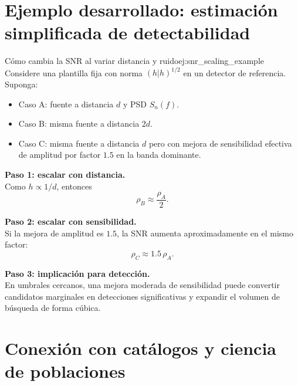 \section{Ejemplo desarrollado: estimación simplificada de detectabilidad}
\label{sec:ejemplo_detectabilidad}

\begin{ejemplo}{Cómo cambia la SNR al variar distancia y ruido}{ej:snr_scaling_example}
Considere una plantilla fija con norma $(h|h)^{1/2}$ en un detector de referencia. Suponga:
\begin{itemize}[leftmargin=2em]
  \item Caso A: fuente a distancia $d$ y PSD $S_n(f)$.
  \item Caso B: misma fuente a distancia $2d$.
  \item Caso C: misma fuente a distancia $d$ pero con mejora de sensibilidad efectiva de amplitud por factor $1.5$ en la banda dominante.
\end{itemize}

\textbf{Paso 1: escalar con distancia.} \\
Como $h\propto1/d$, entonces
\begin{equation}
\rho_B \approx \frac{\rho_A}{2}.
\end{equation}

\textbf{Paso 2: escalar con sensibilidad.} \\
Si la mejora de amplitud es $1.5$, la SNR aumenta aproximadamente en el mismo factor:
\begin{equation}
\rho_C \approx 1.5\,\rho_A.
\end{equation}

\textbf{Paso 3: implicación para detección.} \\
En umbrales cercanos, una mejora moderada de sensibilidad puede convertir candidatos marginales en detecciones significativas y expandir el volumen de búsqueda de forma cúbica.
\end{ejemplo}

\section{Conexión con catálogos y ciencia de poblaciones}
\label{sec:catalogos_poblaciones}

